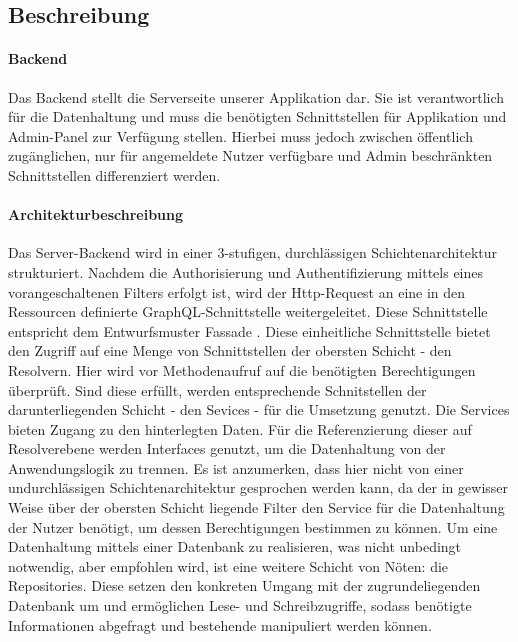 \subsection{Beschreibung}%

\paragraph*{Backend}
Das \dq Backend \dq stellt die Serverseite unserer Applikation dar. Sie ist verantwortlich für die Datenhaltung und muss die benötigten Schnittstellen für Applikation und Admin-Panel zur Verfügung stellen.
 Hierbei muss jedoch zwischen öffentlich zugänglichen, nur für angemeldete Nutzer verfügbare und Admin beschränkten Schnittstellen differenziert werden.
\paragraph*{Architekturbeschreibung}
Das Server-Backend wird in einer 3-stufigen, durchlässigen Schichtenarchitektur strukturiert. Nachdem die Authorisierung und Authentifizierung
mittels eines vorangeschaltenen Filters erfolgt ist, wird der Http-Request an eine in den Ressourcen definierte GraphQL-Schnittstelle weitergeleitet. Diese Schnittstelle
entspricht dem Entwurfsmuster \dq Fassade \dq. Diese einheitliche Schnittstelle bietet den Zugriff auf eine Menge von Schnittstellen der obersten Schicht - den Resolvern.
Hier wird vor Methodenaufruf auf die benötigten Berechtigungen überprüft. Sind diese erfüllt, werden entsprechende Schnitstellen der darunterliegenden Schicht - den Sevices - 
für die Umsetzung genutzt. Die Services bieten Zugang zu den hinterlegten Daten. Für die Referenzierung dieser auf Resolverebene werden Interfaces genutzt, um die Datenhaltung 
von der Anwendungslogik zu trennen. Es ist anzumerken, dass hier nicht von einer undurchlässigen Schichtenarchitektur gesprochen werden kann, da der in gewisser Weise
über der obersten Schicht liegende Filter den Service für die Datenhaltung der Nutzer benötigt, um dessen Berechtigungen bestimmen zu können.
Um eine Datenhaltung mittels einer Datenbank zu realisieren, was nicht unbedingt notwendig, aber empfohlen wird, ist eine weitere Schicht von Nöten: die Repositories.
Diese setzen den konkreten Umgang mit der zugrundeliegenden Datenbank um und ermöglichen Lese- und Schreibzugriffe, sodass benötigte Informationen abgefragt und bestehende manipuliert 
werden können.
 
